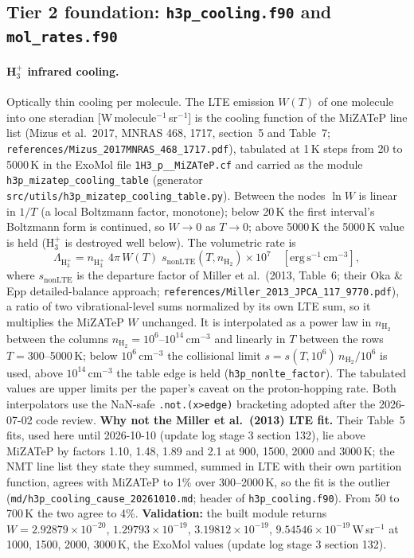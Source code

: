 \documentclass[english,a4paper]{my_memo}
\begin{document}
\subsection{Tier 2 foundation: \texttt{h3p\_cooling.f90} and \texttt{mol\_rates.f90}}\label{sub:t2}

\paragraph{H$_3^+$ infrared cooling.} Optically thin cooling per molecule. The LTE
emission $W(T)$ of one molecule into one steradian [W\,molecule$^{-1}$\,sr$^{-1}$] is the
cooling function of the MiZATeP line list (Mizus et al.\ 2017, MNRAS 468, 1717, section~5
and Table~7; \texttt{references/Mizus\_2017MNRAS\_468\_1717.pdf}), tabulated at 1\,K steps
from 20 to 5000\,K in the ExoMol file \texttt{1H3\_p\_\_MiZATeP.cf} and carried as the
module \texttt{h3p\_mizatep\_cooling\_table} (generator
\texttt{src/utils/h3p\_mizatep\_cooling\_table.py}). Between the nodes $\ln W$ is linear in
$1/T$ (a local Boltzmann factor, monotone); below 20\,K the first interval's Boltzmann form
is continued, so $W\to0$ as $T\to0$; above 5000\,K the 5000\,K value is held (H$_3^+$ is
destroyed well below). The volumetric rate is
\begin{equation}
  \Lambda_{\mathrm{H_3^+}} = n_{\mathrm{H_3^+}}\;4\pi\,W(T)\;
  s_\mathrm{nonLTE}(T,n_{\mathrm{H_2}})\times10^{7}
  \quad[\mathrm{erg\,s^{-1}\,cm^{-3}}],
\end{equation}
where $s_\mathrm{nonLTE}$ is the departure factor of Miller et al.\ (2013, Table~6; their
Oka \& Epp detailed-balance approach; \texttt{references/Miller\_2013\_JPCA\_117\_9770.pdf}),
a ratio of two vibrational-level sums normalized by its own LTE sum, so it multiplies the
MiZATeP $W$ unchanged. It is interpolated as a power law in $n_\mathrm{H_2}$ between the
columns $n_\mathrm{H_2}=10^{6}$--$10^{14}$\,cm$^{-3}$ and linearly in $T$ between the rows
$T=300$--5000\,K; below $10^{6}$\,cm$^{-3}$ the collisional limit
$s=s(T,10^{6})\,n_\mathrm{H_2}/10^{6}$ is used, above $10^{14}$\,cm$^{-3}$ the table edge is
held (\texttt{h3p\_nonlte\_factor}). The tabulated values are upper limits per the paper's
caveat on the proton-hopping rate. Both interpolators use the NaN-safe
\texttt{.not.(x>edge)} bracketing adopted after the 2026-07-02 code review.
\textbf{Why not the Miller et al.\ (2013) LTE fit.} Their Table~5 fits, used here until
2026-10-10 (update log stage 3 section 132), lie above MiZATeP by factors 1.10, 1.48, 1.89
and 2.1 at 900, 1500, 2000 and 3000\,K; the NMT line list they state they summed, summed in
LTE with their own partition function, agrees with MiZATeP to 1\% over 300--2000\,K, so the
fit is the outlier (\texttt{md/h3p\_cooling\_cause\_20261010.md}; header of
\texttt{h3p\_cooling.f90}). From 50 to 700\,K the two agree to 4\%.
\textbf{Validation:} the built module returns $W = 2.92879\times10^{-20}$,
$1.29793\times10^{-19}$, $3.19812\times10^{-19}$, $9.54546\times10^{-19}$\,W\,sr$^{-1}$ at
1000, 1500, 2000, 3000\,K, the ExoMol values (update log stage 3 section 132).
\end{document}
